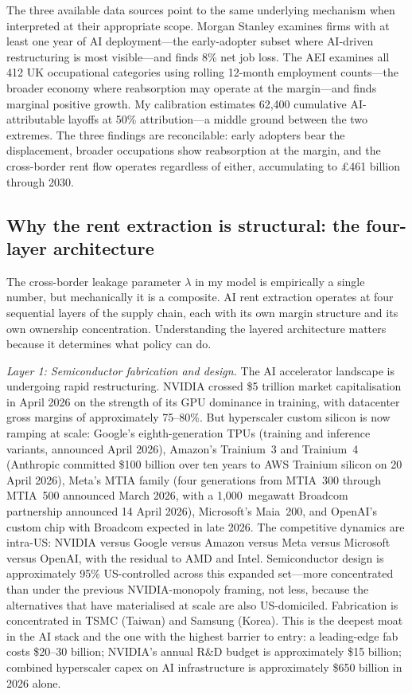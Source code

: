 \documentclass[11pt,letterpaper]{article}
\theoremstyle{remark}
\begin{document}
The three available data sources point to the same underlying mechanism when interpreted at their appropriate scope. {Morgan Stanley} examines firms with at least one year of {AI} deployment---the early-adopter subset where {AI}-driven restructuring is most visible---and finds 8\% net job loss. The {AEI} examines all 412 {UK} occupational categories using rolling 12-month employment counts---the broader economy where reabsorption may operate at the margin---and finds marginal positive growth. My calibration estimates 62{,}400 cumulative {AI}-attributable layoffs at 50\% attribution---a middle ground between the two extremes. The three findings are reconcilable: early adopters bear the displacement, broader occupations show reabsorption at the margin, and the cross-border rent flow operates regardless of either, accumulating to \pounds461 billion through 2030.

\subsection{Why the rent extraction is structural: the four-layer architecture}

The cross-border leakage parameter $\lambda$ in my model is empirically a single number, but mechanically it is a composite. {AI} rent extraction operates at four sequential layers of the supply chain, each with its own margin structure and its own ownership concentration. Understanding the layered architecture matters because it determines what policy can do.

\textit{Layer 1: Semiconductor fabrication and design.} The {AI} accelerator landscape is undergoing rapid restructuring. NVIDIA crossed \$5 trillion market capitalisation in April 2026 on the strength of its {GPU} dominance in training, with datacenter gross margins of approximately 75--80\%. But hyperscaler custom silicon is now ramping at scale: Google's eighth-generation {TPU}s (training and inference variants, announced April 2026), Amazon's Trainium~3 and Trainium~4 (Anthropic committed \$100 billion over ten years to AWS Trainium silicon on 20 April 2026), Meta's MTIA family (four generations from MTIA~300 through MTIA~500 announced March 2026, with a 1{,}000~megawatt Broadcom partnership announced 14 April 2026), Microsoft's Maia~200, and OpenAI's custom chip with Broadcom expected in late 2026. The competitive dynamics are intra-{US}: NVIDIA versus Google versus Amazon versus Meta versus Microsoft versus OpenAI, with the residual to {AMD} and Intel. Semiconductor design is approximately 95\% {US}-controlled across this expanded set---more concentrated than under the previous NVIDIA-monopoly framing, not less, because the alternatives that have materialised at scale are also {US}-domiciled. Fabrication is concentrated in {TSMC} (Taiwan) and Samsung (Korea). This is the deepest moat in the {AI} stack and the one with the highest barrier to entry: a leading-edge fab costs \$20--30 billion; NVIDIA's annual {R\&D} budget is approximately \$15 billion; combined hyperscaler capex on {AI} infrastructure is approximately \$650 billion in 2026 alone.
\end{document}
